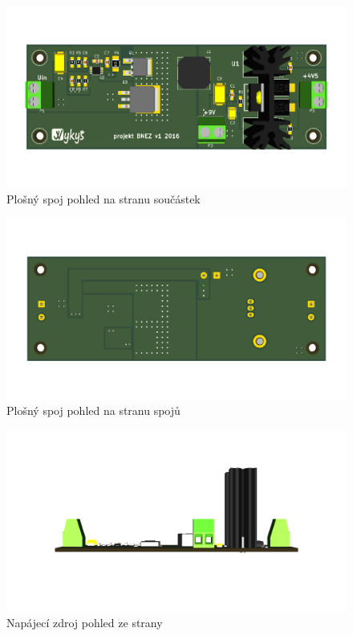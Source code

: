 \begin{figure}[H]
	\centering 	
	\includegraphics[width=\textwidth]{../design/img/xvykyd06_zdroj_2.png}
	\caption{Plošný spoj pohled na stranu součástek}	
\end{figure}

\begin{figure}[H]
	\centering 	
	\includegraphics[width=\textwidth]{../design/img/xvykyd06_zdroj_5.png}
	\caption{Plošný spoj pohled na stranu spojů}	
\end{figure}

\begin{figure}[H]
	\centering 	
	\includegraphics[width=\textwidth]{../design/img/xvykyd06_zdroj_3.png}
	\caption{Napájecí zdroj pohled ze strany}	
\end{figure}

